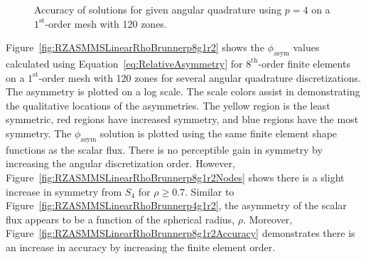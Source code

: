 \documentclass[12pt,letterpaper]{article}
\begin{document}
\begin{figure}[!htb]
\centering
{}
\caption{Accuracy of solutions for given angular quadrature using $p=4$ on a $1^\text{st}$-order mesh with 120 zones.}
\label{fig:RZASMMSLinearRhoBrunnerp4g1r2Accuracy}
\end{figure}

\FloatBarrier

Figure~\ref{fig:RZASMMSLinearRhoBrunnerp8g1r2} shows the $\phi_\text{asym}$ values calculated using Equation~\ref{eq:RelativeAsymmetry} for $8^\text{th}$-order finite elements on a $1^\text{st}$-order mesh with 120 zones for several angular quadrature discretizations. The asymmetry is plotted on a log scale. The scale colors assist in demonstrating the qualitative locations of the asymmetries. The yellow region is the least symmetric, red regions have increased symmetry, and blue regions have the most symmetry. The $\phi_\text{asym}$ solution is plotted using the same finite element shape functions as the scalar flux. There is no perceptible gain in symmetry by increasing the angular discretization order. However, Figure~\ref{fig:RZASMMSLinearRhoBrunnerp8g1r2Nodes} shows there is a slight increase in symmetry from $S_4$ for $\rho \geq 0.7$. Similar to Figure~\ref{fig:RZASMMSLinearRhoBrunnerp4g1r2}, the asymmetry of the scalar flux appears to be a function of the spherical radius, $\rho$. Moreover, Figure~\ref{fig:RZASMMSLinearRhoBrunnerp8g1r2Accuracy} demonstrates there is an increase in accuracy by increasing the finite element order.
\end{document}
